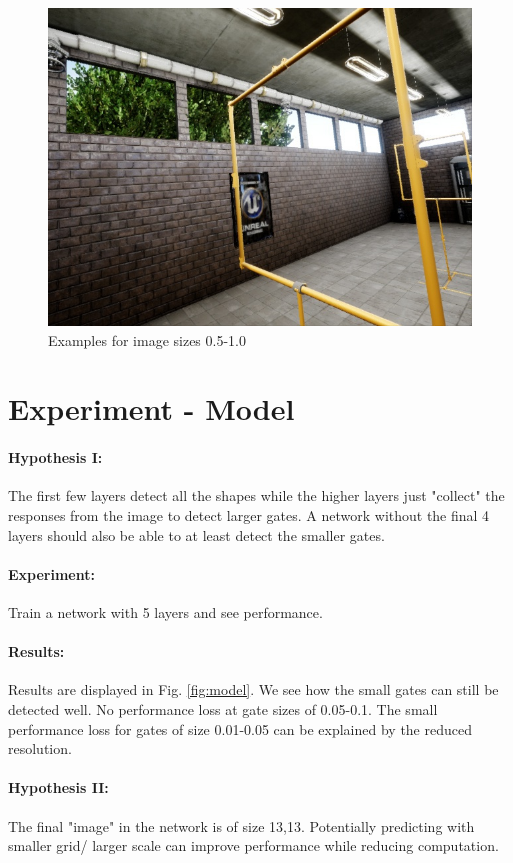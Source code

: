 \documentclass{article}
\begin{document}
\begin{figure}[htbp]
\begin{minipage}{0.3\linewidth}
	\includegraphics[width=\linewidth]{size_examples/05-10 (7).jpg}
\end{minipage}
	\caption{Examples for image sizes 0.5-1.0}
\end{figure}
\newpage
\section{Experiment - Model}

\paragraph{Hypothesis I:} The first few layers detect all the shapes while the higher layers just "collect" the responses from the image to detect larger gates. A network without the final 4 layers should also be able to at least detect the smaller gates.
\paragraph{Experiment:} Train a network with 5 layers and see performance.
\paragraph{Results:} Results are displayed in Fig. \ref{fig:model}. We see how the small gates can still be detected well. No performance loss at gate sizes of 0.05-0.1. The small performance loss for gates of size 0.01-0.05 can be explained by the reduced resolution.


\paragraph{Hypothesis II:} The final "image" in the network is of size 13,13. Potentially predicting with smaller grid/ larger scale can improve performance while reducing computation.
\end{document}
